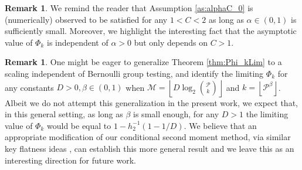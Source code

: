 \documentclass[12pt,reqno]{amsart}
\numberwithin{equation}{section}
\theoremstyle{definition}
\newtheorem{remark}[theorem]{Remark}
\newcommand{\floor}[1]{\left\lfloor #1 \right\rfloor}
\renewcommand{\epsilon}{\varepsilon}
\renewcommand{\[}{\begin{equation}}
\renewcommand{\]}{\end{equation}}
\renewcommand{\|}{\bigg{|}}
\newcommand{\maxwell}[1]{\textcolor{Goldenrod}{\;Max: #1}}
\newcommand{\mSet}{\mathcal{M}}
\newcommand{\pSet}{\mathcal{P}}
\begin{document}
\begin{remark}
    We remind the reader that Assumption \ref{as:alphaC_0} is (numerically) observed to be satisfied for any $1<C<2$ as long as $\alpha \in (0,1)$ is sufficiently small. Moreover, we highlight the interesting fact that the asymptotic value of $\Phi_k$ is independent of $\alpha>0$ but only depends on $C>1$.
\end{remark}


\begin{remark}\label{rem:gen}
    One might be eager to generalize Theorem \ref{thm:Phi_kLim} to a scaling independent of Bernoulli group testing, and identify the limiting $\Phi_k$ for any constants $D>0, \beta \in (0,1)$ when $\mSet = \floor{D \log_2 \binom{\pSet}{k}}$ and $k = \floor{\pSet^{\beta}}$. Albeit we do not attempt this generalization in the present work, we expect that, in this general setting, as long as $\beta$ is small enough, for any $D>1$ the limiting value of $\Phi_k$ would be equal to $1-h_2^{-1}(1-1/D).$ We believe that an appropriate modification of our conditional second moment method, via similar key flatness ideas \cite{balister2018dense}, can establish this more general result and we leave this as an interesting direction for future work.
\end{remark}

\end{document}
